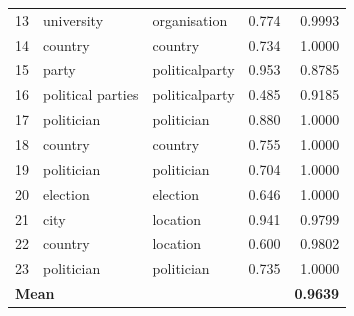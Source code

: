 \documentclass[11pt,a4paper]{article}
\begin{document}
\begin{table}[ht]
\begin{tabular}{r l l r r}
  13 & university                     & organisation           & 0.774 & \cellcolor{green!15}0.9993 \\
  14 & country                        & country                & 0.734 & \cellcolor{green!15}1.0000 \\
  15 & party                          & politicalparty         & 0.953 & \cellcolor{red!15}0.8785 \\
  16 & political parties              & politicalparty         & 0.485 & \cellcolor{yellow!25}0.9185 \\
  17 & politician                     & politician             & 0.880 & \cellcolor{green!15}1.0000 \\
  18 & country                        & country                & 0.755 & \cellcolor{green!15}1.0000 \\
  19 & politician                     & politician             & 0.704 & \cellcolor{green!15}1.0000 \\
  20 & election                       & election               & 0.646 & \cellcolor{green!15}1.0000 \\
  21 & city                           & location               & 0.941 & \cellcolor{yellow!25}0.9799 \\
  22 & country                        & location               & 0.600 & \cellcolor{yellow!25}0.9802 \\
  23 & politician                     & politician             & 0.735 & \cellcolor{green!15}1.0000 \\
\midrule
\multicolumn{3}{l}{\textbf{Mean}} & & \textbf{0.9639} \\
\bottomrule
\end{tabular}
\end{table}

\FloatBarrier
\end{document}
